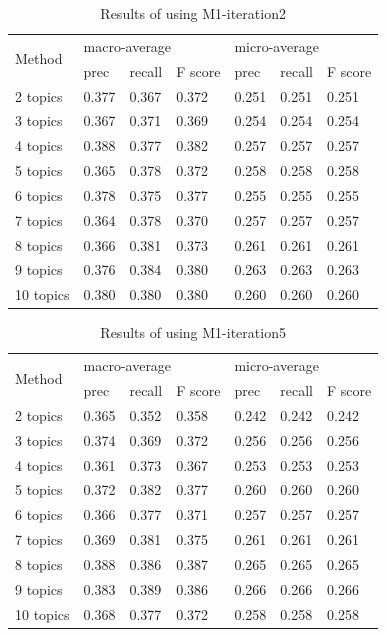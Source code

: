 \begin{table}[!t]
\centering
\caption{Results of using M1-iteration2}
\label{table:microblogM1_2}
\begin{tabular}{|l|l|l|l|l|l|l|}
\hline
\multirow{2}{*}{Method} & \multicolumn{3}{|l|}{macro-average} & \multicolumn{3}{|l|}{micro-average} \\ \cline{2-7}
& prec & recall & F score & prec & recall & F score \\ \hline
2 topics & 0.377 & 0.367 & 0.372 & 0.251 & 0.251 & 0.251 \\ \hline
3 topics & 0.367 & 0.371 & 0.369 & 0.254 & 0.254 & 0.254 \\ \hline
4 topics & 0.388 & 0.377 & 0.382 & 0.257 & 0.257 & 0.257 \\ \hline
5 topics & 0.365 & 0.378 & 0.372 & 0.258 & 0.258 & 0.258 \\ \hline
6 topics & 0.378 & 0.375 & 0.377 & 0.255 & 0.255 & 0.255 \\ \hline
7 topics & 0.364 & 0.378 & 0.370 & 0.257 & 0.257 & 0.257 \\ \hline
8 topics & 0.366 & 0.381 & 0.373 & 0.261 & 0.261 & 0.261 \\ \hline
9 topics & 0.376 & 0.384 & 0.380 & 0.263 & 0.263 & 0.263 \\ \hline
10 topics & 0.380 & 0.380 & 0.380 & 0.260 & 0.260 & 0.260 \\ \hline
\end{tabular}
\end{table} 

\begin{table}[!t]
\centering
\caption{Results of using M1-iteration5}
\label{table:microblogM1_5}
\begin{tabular}{|l|l|l|l|l|l|l|}
\hline
\multirow{2}{*}{Method} & \multicolumn{3}{|l|}{macro-average} & \multicolumn{3}{|l|}{micro-average} \\ \cline{2-7}
& prec & recall & F score & prec & recall & F score \\ \hline
2 topics & 0.365 & 0.352 & 0.358 & 0.242 & 0.242 & 0.242 \\ \hline
3 topics & 0.374 & 0.369 & 0.372 & 0.256 & 0.256 & 0.256 \\ \hline
4 topics & 0.361 & 0.373 & 0.367 & 0.253 & 0.253 & 0.253 \\ \hline
5 topics & 0.372 & 0.382 & 0.377 & 0.260 & 0.260 & 0.260 \\ \hline
6 topics & 0.366 & 0.377 & 0.371 & 0.257 & 0.257 & 0.257 \\ \hline
7 topics & 0.369 & 0.381 & 0.375 & 0.261 & 0.261 & 0.261 \\ \hline
8 topics & 0.388 & 0.386 & 0.387 & 0.265 & 0.265 & 0.265 \\ \hline
9 topics & 0.383 & 0.389 & 0.386 & 0.266 & 0.266 & 0.266 \\ \hline
10 topics & 0.368 & 0.377 & 0.372 & 0.258 & 0.258 & 0.258 \\ \hline
\end{tabular}
\end{table}

